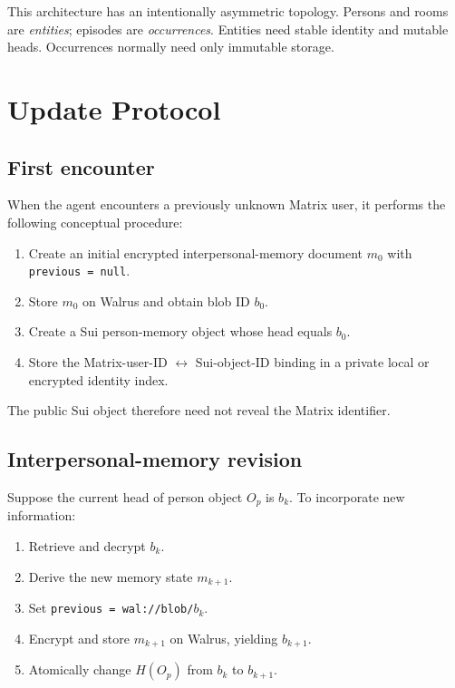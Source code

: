 \documentclass[11pt]{article}
\begin{document}
This architecture has an intentionally asymmetric topology. Persons and rooms are \emph{entities}; episodes are \emph{occurrences}. Entities need stable identity and mutable heads. Occurrences normally need only immutable storage.

\section{Update Protocol}

\subsection{First encounter}

When the agent encounters a previously unknown Matrix user, it performs the following conceptual procedure:

\begin{enumerate}[nosep]
    \item Create an initial encrypted interpersonal-memory document $m_0$ with \texttt{previous = null}.
    \item Store $m_0$ on Walrus and obtain blob ID $b_0$.
    \item Create a Sui person-memory object whose head equals $b_0$.
    \item Store the Matrix-user-ID $\leftrightarrow$ Sui-object-ID binding in a private local or encrypted identity index.
\end{enumerate}

The public Sui object therefore need not reveal the Matrix identifier.

\subsection{Interpersonal-memory revision}

Suppose the current head of person object $O_p$ is $b_k$. To incorporate new information:

\begin{enumerate}[nosep]
    \item Retrieve and decrypt $b_k$.
    \item Derive the new memory state $m_{k+1}$.
    \item Set \texttt{previous = wal://blob/$b_k$}.
    \item Encrypt and store $m_{k+1}$ on Walrus, yielding $b_{k+1}$.
    \item Atomically change $H(O_p)$ from $b_k$ to $b_{k+1}$.
\end{enumerate}
\end{document}
